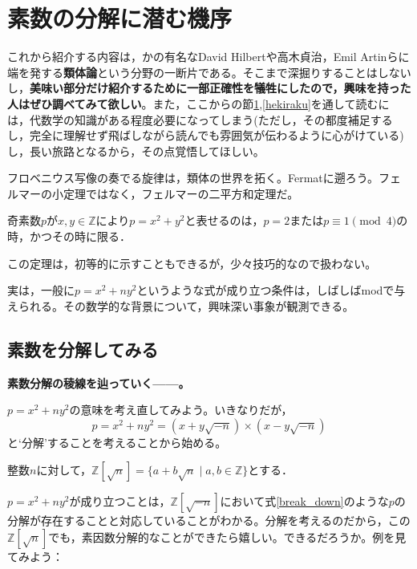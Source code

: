 \section{素数の分解に潜む機序}\label{ruitai_game}
これから紹介する内容は，かの有名なDavid Hilbertや高木貞治，Emil Artinらに端を発する\textbf{類体論}という分野の一断片である。そこまで深掘りすることはしないし，\textbf{美味い部分だけ紹介するために一部正確性を犠牲にしたので，興味を持った人はぜひ調べてみて欲しい}。また，ここからの節\ref{ruitai_game},\ref{hekiraku}を通して読むには，代数学の知識がある程度必要になってしまう(ただし，その都度補足するし，完全に理解せず飛ばしながら読んでも雰囲気が伝わるように心がけている)し，長い旅路となるから，その点覚悟してほしい。

フロベニウス写像の奏でる旋律は，類体の世界を拓く。Fermatに遡ろう。フェルマーの小定理ではなく，フェルマーの二平方和定理だ。

\begin{thm}
    奇素数$p$が$x,y\in \mathbb{Z}$により$p=x^2+y^2$と表せるのは，$p=2$または$p\equiv 1 \pmod{4}$の時，かつその時に限る．
\end{thm}

この定理は，初等的に示すこともできるが，少々技巧的なので扱わない。

実は，一般に$p=x^2+ny^2$というような式が成り立つ条件は，しばしばmodで与えられる。その数学的な背景について，興味深い事象が観測できる。

\subsection{素数を分解してみる}
\textbf{素数分解の稜線を辿っていく------。}

\vspace{10pt}

$p=x^2+ny^2$の意味を考え直してみよう。いきなりだが，
\begin{equation}\label{break_down}
    p=x^2+ny^2=(x+y\sqrt{-n})\times (x-y\sqrt{-n})
\end{equation}
と`分解'することを考えることから始める。

\vspace{10pt}

\begin{dfn}
    整数$n$に対して，$\mathbb{Z}[\sqrt{n}]=\{a+b\sqrt{n} \mid a,b \in \mathbb{Z}\}$とする．
\end{dfn}

$p=x^2+ny^2$が成り立つことは，$\mathbb{Z}[\sqrt{-n}]$において式\eqref{break_down}のような$p$の分解が存在することと対応していることがわかる。分解を考えるのだから，この$\mathbb{Z}[\sqrt{n}]$でも，素因数分解的なことができたら嬉しい。できるだろうか。例を見てみよう：

